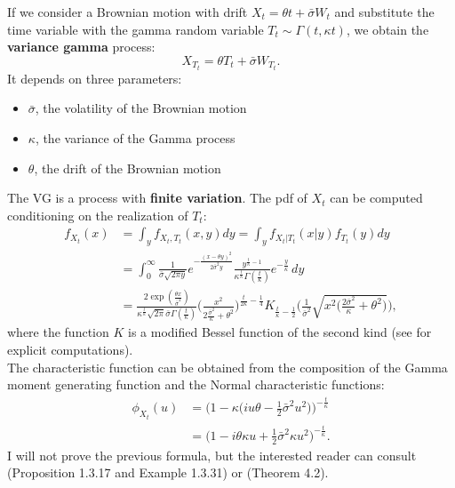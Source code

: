 \documentclass[a4paper,10pt]{article}
\begin{document}
If we consider a Brownian motion with drift $X_t = \theta t + \bar\sigma W_t$ and substitute the time variable with the gamma random variable
$T_t \sim \Gamma(t,\kappa t)$,
we obtain the \textbf{variance gamma} process:
\begin{equation}\label{VG_process}
 X_{T_t} = \theta T_t + \bar\sigma W_{T_t} .
\end{equation}
It depends on three parameters:
\begin{itemize}
 \item $\bar\sigma$, the volatility of the Brownian motion
 \item $\kappa$, the variance of the Gamma process
 \item $\theta$, the drift of the Brownian motion
\end{itemize}
The VG is a process with \textbf{finite variation}. 
The pdf of $X_t$ can be computed conditioning on the realization of $T_t$:
\begin{align}\label{VG_density}
 f_{X_t}(x) &= \int_y f_{X_t,T_t}(x,y) dy = \int_y f_{X_t|T_t}(x|y) f_{T_t}(y) dy \\ \nonumber
         &= \int_0^{\infty} \frac{1}{\bar\sigma \sqrt{2\pi y}} e^{-\frac{(x -\theta y)^2}{2\bar\sigma^2 y}}
         \frac{y^{\frac{t}{\kappa} -1}}{\kappa^{\frac{t}{\kappa}} \Gamma(\frac{t}{\kappa})}
          e^{-\frac{y}{\kappa}} \, dy \\ \nonumber
         &= \frac{2 \exp(\frac{\theta x}{\bar\sigma^2})}{\kappa^{\frac{t}{\kappa}} \sqrt{2\pi}\bar\sigma \Gamma(\frac{t}{\kappa}) }
            \biggl( \frac{x^2}{2\frac{\bar\sigma^2}{\kappa} + \theta^2} \biggr)^{\frac{t}{2\kappa}-\frac{1}{4}} 
            K_{\frac{t}{\kappa}-\frac{1}{2}} 
            \biggl( \frac{1}{\bar\sigma^2} \sqrt{x^2 \bigl(\frac{2\bar\sigma^2}{\kappa}+\theta^2 \bigr)} \biggr),
\end{align}
where the function $K$ is a modified Bessel function of the second kind (see \cite{MCC98} for explicit computations).\\
The characteristic function can be obtained from the composition of the Gamma moment generating function and the Normal characteristic functions: 
\begin{align*}
 \phi_{X_t}(u) &= \biggl( 1- \kappa \bigl( i u\theta -\frac{1}{2}\bar\sigma^2 u^2 \bigr) \biggr)^{-\frac{t}{\kappa}} \\  
	       &= \biggl( 1-i\theta \kappa u + \frac{1}{2} \bar\sigma^2 \kappa u^2 \biggr)^{-\frac{t}{\kappa}}.
\end{align*}
I will not prove the previous formula, but the interested reader can consult \cite{Applebaum} (Proposition 1.3.17 and Example 1.3.31) or \cite{Cont} (Theorem 4.2).\\
\end{document}

